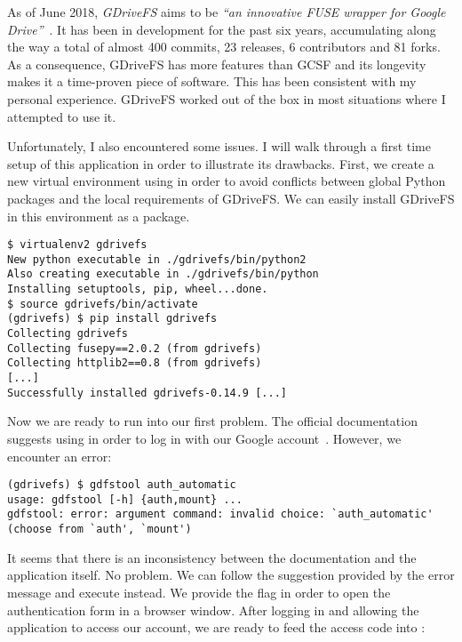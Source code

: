 As of June 2018, \emph{GDriveFS} aims to be \emph{``an innovative FUSE wrapper for Google Drive''}~\cite{dsoprea/GDriveFS}. It has been in development for the past six years, accumulating along the way a total of almost 400 commits, 23 releases, 6 contributors and 81 forks. As a consequence, GDriveFS has more features than GCSF and its longevity makes it a time-proven piece of software. This has been consistent with my personal experience. GDriveFS worked out of the box in most situations where I attempted to use it.

Unfortunately, I also encountered some issues. I will walk through a first time setup of this application in order to illustrate its drawbacks. First, we create a new virtual environment using  in order to avoid conflicts between global Python packages and the local requirements of GDriveFS. We can easily install GDriveFS in this environment as a  package.

\begin{lstlisting}[basicstyle=\footnotesize\ttfamily,frame=single,caption=Creating a virtual environment and installing GDriveFS]
$ virtualenv2 gdrivefs
New python executable in ./gdrivefs/bin/python2
Also creating executable in ./gdrivefs/bin/python
Installing setuptools, pip, wheel...done.
$ source gdrivefs/bin/activate
(gdrivefs) $ pip install gdrivefs
Collecting gdrivefs
Collecting fusepy==2.0.2 (from gdrivefs)
Collecting httplib2==0.8 (from gdrivefs)
[...]
Successfully installed gdrivefs-0.14.9 [...]
\end{lstlisting}

Now we are ready to run into our first problem. The official documentation suggests using  in order to log in with our Google account~\cite{GDriveFS_README}. However, we encounter an error:

\begin{lstlisting}[basicstyle=\footnotesize\ttfamily,frame=single,caption=GDriveFS nonexistent authentication command]
(gdrivefs) $ gdfstool auth_automatic
usage: gdfstool [-h] {auth,mount} ...
gdfstool: error: argument command: invalid choice: `auth_automatic' (choose from `auth', `mount')
\end{lstlisting}

It seems that there is an inconsistency between the documentation and the application itself. No problem. We can follow the suggestion provided by the error message and execute  instead. We provide the  flag in order to open the authentication form in a browser window. After logging in and allowing the application to access our account, we are ready to feed the access code into :

